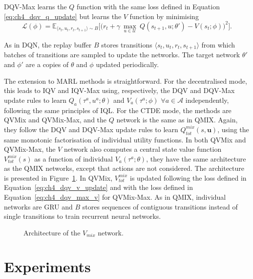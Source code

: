 DQV-Max learns the $Q$ function with the same loss defined in Equation \eqref{eq:ch4_dqv_q_update} but learns the $V$ function by minimising
\begin{equation}
        \mathcal{L}(\phi) = \mathbb{E}_{\langle s_{t}, u_{t},r_{t},s_{t+1}\rangle\sim B} \bigg[\big(r_{t} + \gamma \: \underset{u\in \mathcal{U}}{\max}\: Q(s_{t+1}, u; \theta') - V(s_{t}; \phi)\big)^{2}\bigg].
        \label{eq:ch4_dqv_max_v}
\end{equation}

As in DQN, the replay buffer $B$ stores transitions $\langle s_{t},u_{t},r_{t},s_{t+1}\rangle$ from which batches of transitions are sampled to update the networks.
The target network $\theta'$ and $\phi'$ are a copies of $\theta$ and $\phi$ updated periodically.

The extension to MARL methods is straightforward.
For the decentralised mode, this leads to IQV and IQV-Max using, respectively, the DQV and DQV-Max update rules to learn $Q_a(\tau^a, u^a;\theta)$ and $V_a(\tau^a;\phi)$ $\forall a \in \mathcal{A}$ independently, following the same principles of IQL.
For the CTDE mode, the methods are QVMix and QVMix-Max, and the $Q$ network is the same as in QMIX.
Again, they follow the DQV and DQV-Max update rules to learn $Q^{mix}_{tot}(s, \mathbf{u})$, using the same monotonic factorisation of individual utility functions.
In both QVMix and QVMix-Max, the $V$ network also computes a central state value function $V^{mix}_{tot}(s)$ as a function of individual $V_a(\tau^a;\theta)$, they have the same architecture as the QMIX networks, except that actions are not considered. 
The architecture is presented in Figure~\ref{fig:ch4_qvmix}.
In QVMix, $V^{mix}_{tot}$ is updated following the loss defined in Equation~\ref{eq:ch4_dqv_v_update} and with the loss defined in Equation~\ref{eq:ch4_dqv_max_v} for QVMix-Max.
As in QMIX, individual networks are GRU and $B$ stores sequences of contiguous transitions instead of single transitions to train recurrent neural networks.

\begin{figure}
\centering

\caption{Architecture of the $V_{mix}$ network.}
\label{fig:ch4_qvmix}
\end{figure}

\section{Experiments} \label{sec:ch4_experiments}

